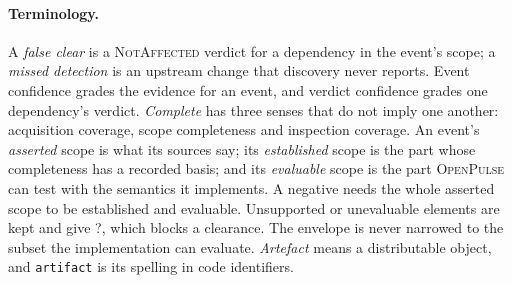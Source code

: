 \documentclass[11pt,a4paper]{article}
\newcommand{\op}{\textsc{OpenPulse}}
\newcommand{\code}[1]{\texttt{#1}}
\newcommand{\Ind}{\textsf{?}}
\begin{document}
\paragraph{Terminology.} A \emph{false clear} is a \textsc{NotAffected}
verdict for a dependency in the event's scope; a \emph{missed
detection} is an upstream change that discovery never reports. Event
confidence grades the evidence for an event, and verdict confidence
grades one dependency's verdict. \emph{Complete} has three senses that
do not imply one another: acquisition coverage, scope completeness
and inspection coverage. An event's \emph{asserted} scope is what its
sources say; its \emph{established} scope is the part whose
completeness has a recorded basis; and its \emph{evaluable} scope is
the part \op{} can test with the semantics it implements. A negative
needs the whole asserted scope to be established and evaluable.
Unsupported or unevaluable elements are kept and give \Ind{}, which
blocks a clearance. The envelope is never narrowed to the subset the
implementation can evaluate.
\emph{Artefact} means a distributable object, and \code{artifact} is
its spelling in code identifiers.
\end{document}
